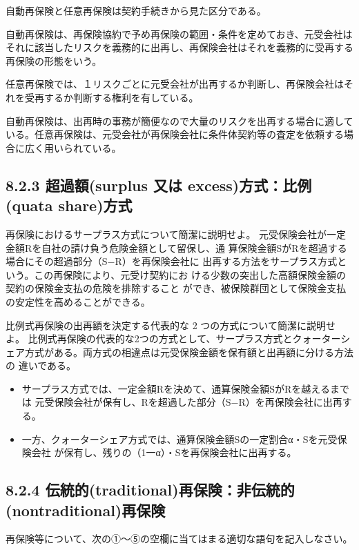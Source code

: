\documentclass[report,gutter=10mm,fore-edge=10mm,uplatex,dvipdfmx]{jlreq}
\begin{document}
\answer{}
自動再保険と任意再保険は契約手続きから見た区分である。

自動再保険は、再保険協約で予め再保険の範囲・条件を定めておき、元受会社はそれに該当したリスクを義務的に出再し、再保険会社はそれを義務的に受再する再保険の形態をいう。

任意再保険では、１リスクごとに元受会社が出再するか判断し、再保険会社はそれを受再するか判断する権利を有している。

自動再保険は、出再時の事務が簡便なので大量のリスクを出再する場合に適している。任意再保険は、元受会社が再保険会社に条件体契約等の査定を依頼する場合に広く用いられている。



\subsection{8.2.3 超過額(surplus 又は excess)方式：比例(quata share)方式}
再保険におけるサープラス方式について簡潔に説明せよ。
\answer{}
元受保険会社が一定金額Rを自社の請け負う危険金額として留保し、通
算保険金額SがRを超過する場合にその超過部分（S−R）を再保険会社に
出再する方法をサープラス方式という。この再保険により、元受け契約にお
ける少数の突出した高額保険金額の契約の保険金支払の危険を排除すること
ができ、被保険群団として保険金支払の安定性を高めることができる。

比例式再保険の出再額を決定する代表的な 2 つの方式について簡潔に説明せよ。
\answer{}
比例式再保険の代表的な2つの方式として、サープラス方式とクォーターシ
ェア方式がある。両方式の相違点は元受保険金額を保有額と出再額に分ける方法の
違いである。

\begin{itemize}
\item[] サープラス方式では、一定金額Rを決めて、通算保険金額SがRを越えるまでは
 元受保険会社が保有し、Rを超過した部分（S−R）を再保険会社に出再する。
\item[] 一方、クォーターシェア方式では、通算保険金額Sの一定割合α・Sを元受保険会社
 が保有し、残りの（1一α）・Sを再保険会社に出再する。
\end{itemize}
\subsection{8.2.4 伝統的(traditional)再保険：非伝統的(nontraditional)再保険}
再保険等について、次の①～⑤の空欄に当てはまる適切な語句を記入しなさい。
\end{document}
